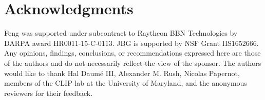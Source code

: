 \section*{Acknowledgments}
Feng was supported under subcontract to Raytheon BBN Technologies by DARPA award
HR0011-15-C-0113.
JBG is supported by NSF Grant IIS1652666.
Any opinions, findings, conclusions, or recommendations expressed here are those
of the authors and do not necessarily reflect the view of the sponsor.
The authors would like to thank Hal Daum{\'e} III, Alexander M. Rush, Nicolas
Papernot, members of the CLIP lab at the University of Maryland, and the anonymous
reviewers for their feedback.
